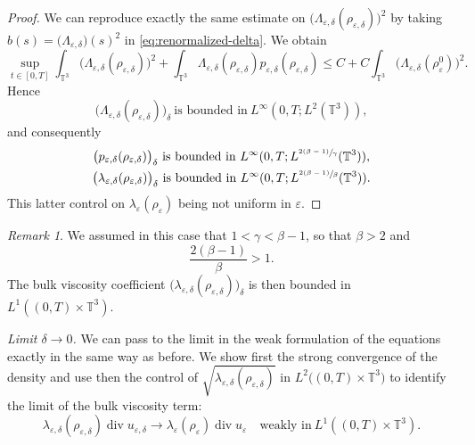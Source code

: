 \documentclass[JEP,XML,SOM,Unicode,NoEqCountersInSection]{cedram}
\newcommand{\<}{\bigl\langle}
\renewcommand{\>}{\bigr\rangle}
\newcommand{\labeleq}[1]{}
\theoremstyle{definition}
\theoremstyle{remark}
\newtheorem{remark}{Remark}
\newcommand{\TT}{\mathbb{T}^3}
\DeclareMathOperator{\Div}{div}
\let\ep\varepsilon
\begin{document}
\begin{proof} We can reproduce exactly the same estimate on $\big(\Lambda_{\ep,\delta}(\rho_{\ep,\delta})\big)^{2}$ by taking $b(s) = \big(\Lambda_{\ep,\delta}\big)(s)^2$ in \eqref{eq:renormalized-delta}.
We obtain\vspace*{-3pt}
\begin{equation*}
\sup_{t \in [0,T]}\int_{\TT}{\big(\Lambda_{\ep,\delta}(\rho_{\ep,\delta})\big)^{2}}
+ \int_{\TT}{\Lambda_{\ep,\delta}(\rho_{\ep,\delta}) p_{\ep,\delta} (\rho_{\ep,\delta})}
\leq C + C\int_{\TT}{\big(\Lambda_{\ep,\delta}(\rho_{\ep}^0)\big)^{2}}.
\end{equation*}
Hence\vspace*{-3pt}
\begin{equation*}\labeleq{Lambdadelta3}
\big(\Lambda_{\ep,\delta}(\rho_{\ep,\delta})\big)_\delta ~ \text{is bounded in} ~ L^\infty(0,T;L^2(\TT)),
\end{equation*}
and consequently\vspace*{-3pt}
\begin{gather*}\labeleq{pdelta3}
\big(p_{\ep,\delta}(\rho_{\ep,\delta})\big)_\delta ~ \text{is bounded in} ~ L^\infty(0,T;L^{\sfrac{2(\beta-1)}{\gamma}}(\TT)),
\\
\labeleq{lambdadelta3}
\big(\lambda_{\ep,\delta}(\rho_{\ep,\delta})\big)_\delta ~ \text{is bounded in} ~ L^\infty(0,T;L^{\sfrac{2(\beta-1)}{\beta}}(\TT)).
\end{gather*}
This latter control on $\lambda_\ep(\rho_\ep)$ being not uniform in $\ep$.
\end{proof}

\begin{remark}\label{rk:control-lambda}
We assumed in this case that $1 <\gamma<\beta-1$, so that $\beta > 2$ and
\[
\dfrac{2(\beta-1)}{\beta} > 1.
\]
The bulk viscosity coefficient $\big(\lambda_{\ep,\delta}(\rho_{\ep,\delta})\big)_\delta$ is then bounded in $L^1((0,T) \times \TT)$.
\end{remark}

\noindent
\textit{Limit $\delta \rightarrow 0$.}
We can pass to the limit in the weak formulation of the equations exactly in the same way as before. We show first the strong convergence of the density and use then the control of $\sqrt{\lambda_{\ep,\delta}(\rho_{\ep,\delta})}$ in $L^2\big((0,T)\times \TT\big)$ to identify the limit of the bulk viscosity term:
\[
\lambda_{\ep,\delta}(\rho_{\ep,\delta})\Div u_{\ep,\delta}
\to
\lambda_\ep(\rho_\ep)\Div u_\ep\quad \text{weakly in}~ L^1((0,T)\times \TT).
\]
\end{document}
